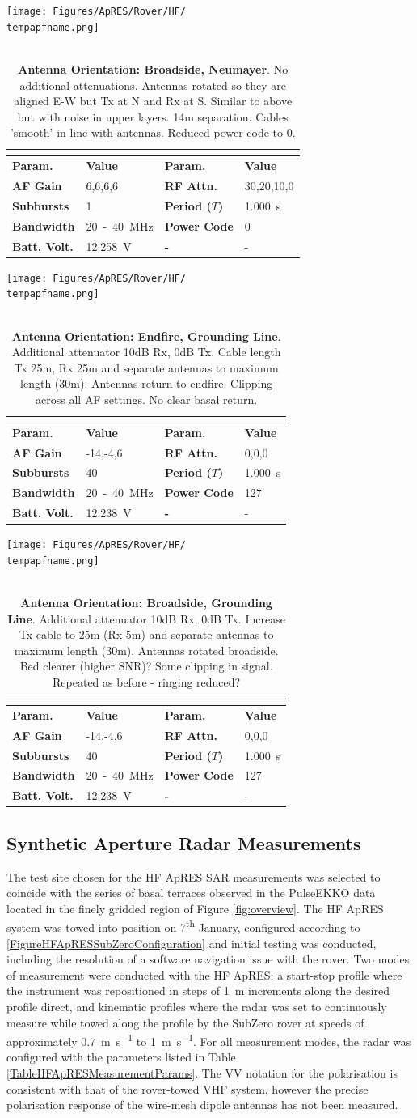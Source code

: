 \documentclass[a4paper,12pt]{article}
\newcommand{\apresdoc}[9]{
    \def\tempapfname{#1}
    \def\tempaploc{#2}
    \def\tempapcom{#3}
    \def\temptimestamp{#4}
    \def\tempafgain{#5}
    \def\temprfattn{#6}
    \def\tempperiod{#7}
    \def\tempflow{#8}
    \def\tempfupp{#9}
    \apresdoccont
}
\newcommand{\apresdoccont}[6]{
  \def\tempnatt{#1}
  \def\tempnchirp{#2}
  \def\tempnsubburst{#3}
  \def\temppowercode{#4}
  \def\tempbattvolt{#5}
  \def\tempaplbl{#6}

  \begin{table}
    \caption{\tempapcom}
    \rowcolors{2}{gray!25}{white}
    \centering
    \texttt{[image: Figures/ApRES/Rover/HF/\\tempapfname.png]}
    \\
    ~\\
    \begin{tabular}{>{\bfseries}l l >{\bfseries}l l}
      \hline
      \rowcolor{gray!50}
      \multicolumn{4}{c}{\textbf{Filename} \tempapfname} \\
      \hline
      Param. & \bfseries Value & Param. & \bfseries Value \\
      AF Gain & \tempafgain &
      RF Attn. & \temprfattn \\
      Subbursts & \tempnsubburst &
      Period ($T$) & \tempperiod~s \\
      Bandwidth & \tempflow~-~\tempfupp~MHz &
      Power Code & \temppowercode \\
      Batt. Volt. & \tempbattvolt~V &
      - & - \\
      \hline
    \end{tabular}
    \label{\tempaplbl}
  \end{table}
}
\begin{document}
\apresdoc{2021-12-29-220442.dat}
{Neumayer III,500m W of Station}
{\textbf{Antenna Orientation: Broadside, Neumayer}. No additional attenuations. Antennas rotated so they are aligned E-W but Tx at N and Rx at S.  Similar to above but with noise in upper layers. 14m separation.  Cables 'smooth' in line with antennas.  Reduced power code to 0.}
{2021-12-29 22:04:45.000}
{6,6,6,6}
{30,20,10,0}
{1.000}
{20}
{40}
{4}
{4}
{1}
{0}
{12.258}
{FigureHFApRESBroadsideNeumayer}

\apresdoc{2022-01-05-174254.dat}
{Grounding Line Camp}
{\textbf{Antenna Orientation: Endfire, Grounding Line}. Additional attenuator 10dB Rx, 0dB Tx.  Cable length Tx 25m, Rx 25m and separate antennas to maximum length (30m).  Antennas return to endfire.  Clipping across all AF settings.  No clear basal return.}
{2022-01-05 17:43:31.000}
{-14,-4,6}
{0,0,0}
{1.000}
{20}
{40}
{3}
{120}
{40}
{127}
{12.238}
{FigureHFApRESEndfireGroundingLine}

\apresdoc{2022-01-05-171029.dat}
{Grounding Line Camp}
{\textbf{Antenna Orientation: Broadside, Grounding Line}. Additional attenuator 10dB Rx, 0dB Tx.  Increase Tx cable to 25m (Rx 5m) and separate antennas to maximum length (30m).  Antennas rotated broadside.  Bed clearer (higher SNR)? Some clipping in signal.  Repeated as before - ringing reduced?}
{2022-01-05 17:10:51.000}
{-14,-4,6}
{0,0,0}
{1.000}
{20}
{40}
{3}
{120}
{40}
{127}
{12.238}
{FigureHFApRESBroadsideGroundingLine}
\clearpage

\subsection{Synthetic Aperture Radar Measurements}
The test site chosen for the HF ApRES SAR measurements was selected to coincide
with the series of basal terraces observed in the PulseEKKO data located in the
finely gridded region of Figure \ref{fig:overview}.  The HF ApRES system was
towed into position on 7\textsuperscript{th} January, configured according to
\ref{FigureHFApRESSubZeroConfiguration} and initial testing was conducted,
including the resolution of a software navigation issue with the rover.  Two
modes of measurement were conducted with the HF ApRES: a start-stop profile
where the instrument was repositioned in steps of \SI{1}{\metre} increments
along the desired profile direct, and kinematic profiles where the radar was set
to continuously measure while towed along the profile by the SubZero rover at
speeds of approximately \SI{0.7}{\metre\per\second} to
\SI{1}{\metre\per\second}.  For all measurement modes, the radar was configured
with the parameters listed in Table \ref{TableHFApRESMeasurementParams}.  The 
VV notation for the polarisation is consistent with that of the rover-towed VHF
system, however the precise polarisation response of the wire-mesh dipole
antennas has not been measured.
\end{document}
